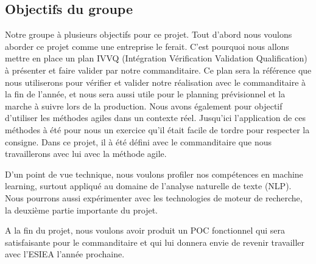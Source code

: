 \subsection {Objectifs du groupe}
Notre groupe à plusieurs objectifs pour ce projet.
Tout d'abord nous voulons aborder ce projet comme une entreprise le ferait.
C'est pourquoi nous allons mettre en place un plan IVVQ (Intégration Vérification Validation Qualification) à présenter et faire valider par notre commanditaire.
Ce plan sera la référence que nous utiliserons pour vérifier et valider notre réalisation avec le commanditaire à la fin de l'année, et nous sera aussi utile pour le planning prévisionnel et la marche à suivre lors de la production.
Nous avons également pour objectif d'utiliser les méthodes agiles dans un contexte réel.
Jusqu'ici l'application de ces méthodes à été pour nous un exercice qu'il était facile de tordre pour respecter la consigne.
Dans ce projet, il à été défini avec le commanditaire que nous travaillerons avec lui avec la méthode agile.


D'un point de vue technique, nous voulons profiler nos compétences en machine learning, surtout appliqué au domaine de l'analyse naturelle de texte (NLP).
Nous pourrons aussi expérimenter avec les technologies de moteur de recherche, la deuxième partie importante du projet.


A la fin du projet, nous voulons avoir produit un POC fonctionnel qui sera satisfaisante pour le commanditaire et qui lui donnera envie de revenir travailler avec l'ESIEA l'année prochaine.





